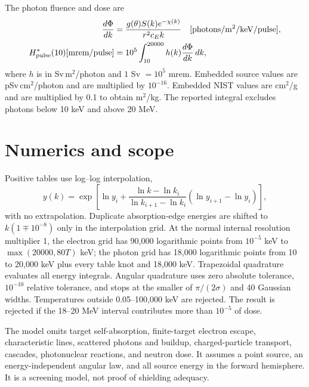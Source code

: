 \documentclass[10pt,a4paper]{article}
\begin{document}
The photon fluence and dose are
\begin{align}
\frac{d\Phi}{dk}&=\frac{g(\theta)S(k)e^{-\chi(k)}}{r^2c_Ek}
\quad[\mathrm{photons/m^2/keV/pulse}],\\
H^*_{\rm pulse}(10)[\mathrm{mrem/pulse}]&=10^5\int_{10}^{20000}h(k)\frac{d\Phi}{dk}\,dk,
\end{align}
where $h$ is in Sv\,m$^2$/photon and $1$ Sv $=10^5$ mrem. Embedded source values are pSv\,cm$^2$/photon and are multiplied by $10^{-16}$. Embedded NIST values are cm$^2$/g and are multiplied by 0.1 to obtain m$^2$/kg. The reported integral excludes photons below 10 keV and above 20 MeV.

\section{Numerics and scope}
Positive tables use log--log interpolation,
\begin{equation}y(k)=\exp\left[\ln y_i+\frac{\ln k-\ln k_i}{\ln k_{i+1}-\ln k_i}(\ln y_{i+1}-\ln y_i)\right],\end{equation}
with no extrapolation. Duplicate absorption-edge energies are shifted to $k(1\mp10^{-8})$ only in the interpolation grid. At the normal internal resolution multiplier 1, the electron grid has 90,000 logarithmic points from $10^{-5}$ keV to $\max(20000,80T)$ keV; the photon grid has 18,000 logarithmic points from 10 to 20,000 keV plus every table knot and 18,000 keV. Trapezoidal quadrature evaluates all energy integrals. Angular quadrature uses zero absolute tolerance, $10^{-10}$ relative tolerance, and stops at the smaller of $\pi/(2\sigma)$ and 40 Gaussian widths. Temperatures outside 0.05--100,000 keV are rejected. The result is rejected if the 18--20 MeV interval contributes more than $10^{-5}$ of dose.

The model omits target self-absorption, finite-target electron escape, characteristic lines, scattered photons and buildup, charged-particle transport, cascades, photonuclear reactions, and neutron dose. It assumes a point source, an energy-independent angular law, and all source energy in the forward hemisphere. It is a screening model, not proof of shielding adequacy.
\end{document}

